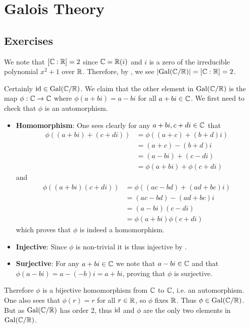 \section{Galois Theory}
\subsection*{Exercises}
\begin{questions}
    \item \begin{partquestions}{\roman*}
        \item We note that $[\mathbb{C}:\mathbb{R}] = 2$ since $\mathbb{C} = \mathbb{R}(i)$ and $i$ is a zero of the irreducible polynomial $x^2 + 1$ over $\mathbb{R}$. Therefore, by , we see $|\mathrm{Gal}(\mathbb{C}/\mathbb{R})| = [\mathbb{C}:\mathbb{R}] = 2$.

        \item Certainly $\mathrm{id} \in \mathrm{Gal}(\mathbb{C}/\mathbb{R})$. We claim that the other element in $\mathrm{Gal}(\mathbb{C}/\mathbb{R})$ is the map $\phi: \mathbb{C} \to \mathbb{C}$ where $\phi(a+bi) = a-bi$ for all $a+bi \in \mathbb{C}$. We first need to check that $\phi$ is an automorphism.
        \begin{itemize}
            \item \textbf{Homomorphism}: One sees clearly for any $a+bi, c+di \in \mathbb{C}$ that
            \begin{align*}
                \phi((a+bi)+(c+di)) &= \phi((a+c)+(b+d)i)\\
                &= (a+c)-(b+d)i\\
                &= (a-bi) + (c-di)\\
                &= \phi(a+bi) + \phi(c+di)
            \end{align*}
            and
            \begin{align*}
                \phi((a+bi)(c+di)) &= \phi((ac-bd) + (ad+bc)i)\\
                &= (ac-bd) - (ad+bc)i\\
                &= (a-bi)(c-di)\\
                &= \phi(a+bi)\phi(c+di)
            \end{align*}
            which proves that $\phi$ is indeed a homomorphism.

            \item \textbf{Injective}: Since $\phi$ is non-trivial it is thus injective by .

            \item \textbf{Surjective}: For any $a + bi \in \mathbb{C}$ we note that $a - bi \in \mathbb{C}$ and that $\phi(a - bi) = a - (-b)i = a+bi$, proving that $\phi$ is surjective.
        \end{itemize}
        Therefore $\phi$ is a bijective homomorphism from $\mathbb{C}$ to $\mathbb{C}$, i.e. an automorphism. One also sees that $\phi(r) = r$ for all $r \in \mathbb{R}$, so $\phi$ fixes $\mathbb{R}$. Thus $\phi \in \mathrm{Gal}(\mathbb{C}/\mathbb{R})$. But as $\mathrm{Gal}(\mathbb{C}/\mathbb{R})$ has order 2, thus $\mathrm{id}$ and $\phi$ are the only two elements in $\mathrm{Gal}(\mathbb{C}/\mathbb{R})$.
    \end{partquestions}


\end{questions}
